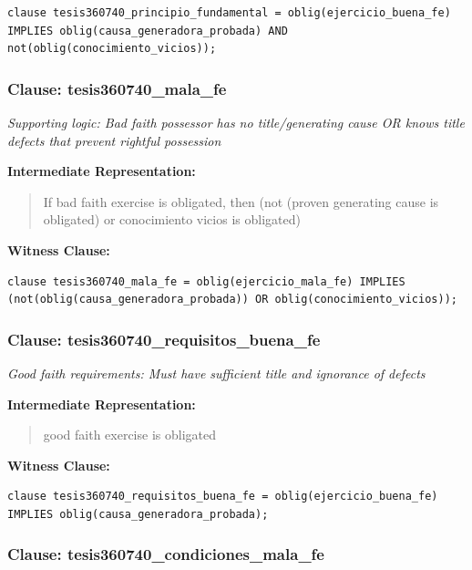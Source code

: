 \documentclass[11pt,a4paper]{article}
\begin{document}
\begin{lstlisting}[style=witnessstyle, language=Witness]
clause tesis360740_principio_fundamental = oblig(ejercicio_buena_fe) IMPLIES oblig(causa_generadora_probada) AND not(oblig(conocimiento_vicios));
\end{lstlisting}

\subsubsection{Clause: tesis360740\_mala\_fe}

\textit{Supporting logic: Bad faith possessor has no title/generating cause OR knows title defects that prevent rightful possession}

\textbf{Intermediate Representation:}

\begin{quote}
If bad faith exercise is obligated, then (not (proven generating cause is obligated) or conocimiento vicios is obligated)
\end{quote}

\textbf{Witness Clause:}

\begin{lstlisting}[style=witnessstyle, language=Witness]
clause tesis360740_mala_fe = oblig(ejercicio_mala_fe) IMPLIES (not(oblig(causa_generadora_probada)) OR oblig(conocimiento_vicios));
\end{lstlisting}

\subsubsection{Clause: tesis360740\_requisitos\_buena\_fe}

\textit{Good faith requirements: Must have sufficient title and ignorance of defects}

\textbf{Intermediate Representation:}

\begin{quote}
good faith exercise is obligated
\end{quote}

\textbf{Witness Clause:}

\begin{lstlisting}[style=witnessstyle, language=Witness]
clause tesis360740_requisitos_buena_fe = oblig(ejercicio_buena_fe) IMPLIES oblig(causa_generadora_probada);
\end{lstlisting}

\subsubsection{Clause: tesis360740\_condiciones\_mala\_fe}
\end{document}

